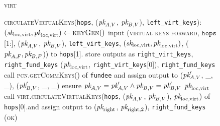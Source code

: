 \begin{figure}[H]
\begin{processbox}{\textsc{virt}}
\begin{algorithmic}[1]
      \State \textsc{circulateVirtualKeys}(\texttt{hops}, ($\textit{pk}_{A, V}$, $\textit{pk}_{B,
      V}$), \texttt{left\_virt\_keys}):
      \Indent
        \State {}
        \State $(\textit{sk}_{\mathrm{loc}, \mathrm{virt}}, \textit{pk}_{\mathrm{loc},
        \mathrm{virt}}) \gets \textsc{keyGen}()$
         
           
            \State input (\textsc{virtual keys forward}, $\texttt{hops}$[1:],
            ($\textit{pk}_{A, V}$, $\textit{pk}_{B, V}$), \texttt{left\_virt\_keys},
            $(\textit{sk}_{\mathrm{loc}, \mathrm{virt}}, \textit{pk}_{\mathrm{loc},
            \mathrm{virt}})$, ($\textit{pk}_{A, F}, \textit{pk}_{B, F}$)) to
            \texttt{hops}[1].\alice{} 
            \State {}
            \State {}
            \State {}
            \State store outputs as \texttt{right\_virt\_keys},
            \texttt{right\_fund\_keys}
            \State \Return ($\textit{pk}_{\mathrm{loc}, \mathrm{virt}}$,
            \texttt{right\_virt\_keys}[0]),
            \texttt{right\_fund\_keys}
          \Else \: 
            \State {}
            \State call \textsc{pcn.getCommKeys}() of \texttt{fundee} and assign
            output to ($\textit{pk}_{A, V}'$, \_, \_), ($\textit{pk}_{B, V}'$, \_, \_)
            \State ensure $\textit{pk}_{A, V} = \textit{pk}_{A, V}' \wedge \textit{pk}_{B, V} = \textit{pk}_{B, V}'$
            \State \Return $\textit{pk}_{\mathrm{loc}, \mathrm{virt}}$
          \EndIf
        \Else \: 
          \State call \textsc{virt.circulateVirtualKeys}(\texttt{hops}, ($\textit{pk}_{A,
          V}$, $\textit{pk}_{B, V}$), $\textit{pk}_{\mathrm{loc}, \mathrm{virt}}$) of
          \texttt{hops}[0].\bob and assign output to ($\textit{pk}_{\mathrm{right}}$,
          $\textit{pk}_{\mathrm{right}, 2}$), \texttt{right\_fund\_keys}
          \State \Return (\textsc{ok})
        \EndIf
      \EndIndent
    \end{algorithmic}
  \end{processbox}
  \caption{}
  \label{code:virtual-layer:keys}
\end{figure}

